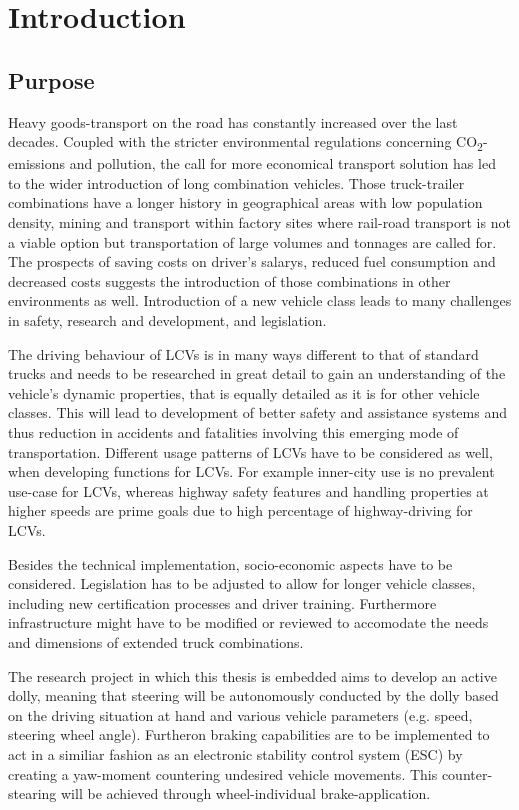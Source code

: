 \documentclass[ExampleMasters.tex]{subfiles}
\begin{document}
\clearpage	
\chapter{Introduction}
\label{chap:introduction}

\section{Purpose}
\label{sec:purpose}
Heavy goods-transport on the road has constantly increased over the last decades. Coupled with the stricter environmental regulations concerning CO\textsubscript{2}-emissions and pollution, the call for more economical transport solution has led to the wider introduction of long combination vehicles. Those truck-trailer combinations have a longer history in geographical areas with low population density, mining and transport within factory sites where rail-road transport is not a viable option but transportation of large volumes and tonnages are called for. The prospects of saving costs on driver's salarys, reduced fuel consumption and decreased costs suggests the introduction of those combinations in other environments as well. Introduction of a new vehicle class leads to many challenges in safety, research and development, and legislation. 

The driving behaviour of LCVs is in many ways different to that of standard trucks and needs to be researched in great detail to gain an understanding of the vehicle's dynamic properties, that is equally detailed as it is for other vehicle classes. This will lead to development of better safety and assistance systems and thus reduction in accidents and fatalities involving this emerging mode of transportation. Different usage patterns of LCVs have to be considered as well, when developing functions for LCVs. For example inner-city use is no prevalent use-case for LCVs, whereas highway safety features and handling properties at higher speeds are prime goals due to high percentage of highway-driving for LCVs.

Besides the technical implementation, socio-economic aspects have to be considered. Legislation has to be adjusted to allow for longer vehicle classes, including new certification processes and driver training. Furthermore infrastructure might have to be modified or reviewed to accomodate the needs and dimensions of extended truck combinations.

The research project in which this thesis is embedded aims to develop an active dolly, meaning that steering will be autonomously conducted by the dolly based on the driving situation at hand and various vehicle parameters (e.g. speed, steering wheel angle). Furtheron braking capabilities are to be implemented to act in a similiar fashion as an electronic stability control system (ESC) by creating a yaw-moment countering undesired vehicle movements. This counter-stearing will be achieved through wheel-individual brake-application. 
\end{document}
